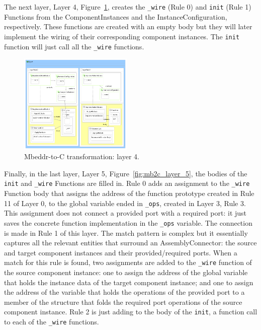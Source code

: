 The next layer, Layer 4, Figure~\ref{fig:mb2c_layer_4}, creates the \verb=_wire=
(Rule 0) and \verb=init= (Rule 1) Functions from the ComponentInstances and the
InstanceConfiguration, respectively. These functions are created with an empty
body but they will later implement the wiring of their
corresponding component instances. The \verb=init= function will just call all
the \verb=_wire= functions.

\begin{figure}
\begin{center}
  \includegraphics[width=0.48\textwidth]{figures/mbeddr/mbeddr2C_optimized_layer_4}
  \caption{Mbeddr-to-C transformation: layer 4.}
  \label{fig:mb2c_layer_4}
\end{center}
\end{figure}

Finally, in the last layer, Layer 5, Figure~\ref{fig:mb2c_layer_5}, the bodies
of the \verb=init= and \verb=_wire= Functions are filled in.
Rule 0 adds an assignment to the \verb=_wire= Function body that assigns the
address of the function prototype created in Rule 11 of Layer 0, to the global
variable ended in \verb=_ops=, created in Layer 3, Rule 3.
This assignment does not connect a provided port with a required port:
it just saves the concrete function implementation in the \verb=_ops= variable.
The connection is made in Rule 1 of this layer. The match pattern is complex but
it essentially captures all the relevant entities that surround an
AssemblyConnector: the source and target component instances and their
provided/required ports. When a match for this rule is found, two assignments
are added to the \verb=_wire= function of the source component instance:
one to assign the address of the global variable that holds the instance data of
the target component instance; and one to assign the address of the variable
that holds the operations of the provided port to a member of the structure that
folds the required port operations of the source component instance.
Rule 2 is just adding to the body of the \verb=init=, a function call to each of
the \verb=_wire= functions.

